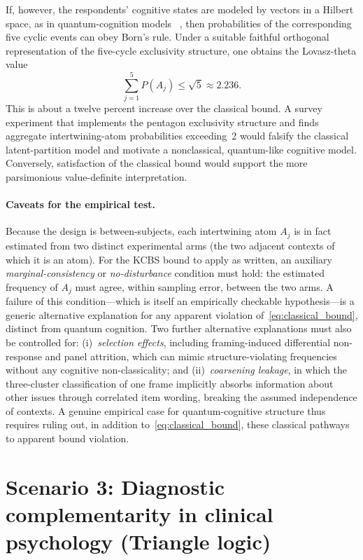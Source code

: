 \documentclass{article}
\begin{document}
If, however, the respondents' cognitive states are modeled by
vectors in a Hilbert space, as in quantum-cognition models
~\cite{Busemeyer2012}, then probabilities of the corresponding
five cyclic events can obey Born's rule. Under a suitable faithful
orthogonal representation of the five-cycle exclusivity structure,
one obtains the Lovasz-theta value
\begin{equation}
\sum_{j=1}^{5} P(A_j) \leq \sqrt{5}
\approx 2.236.
\label{eq:quantum_bound}
\end{equation}
This is about a twelve percent increase over the classical bound. A
survey experiment that implements the pentagon exclusivity structure
and finds aggregate intertwining-atom probabilities exceeding~2
would falsify the classical latent-partition model and motivate a
nonclassical, quantum-like cognitive model. Conversely, satisfaction
of the classical bound would support the more parsimonious
value-definite interpretation.

\paragraph{Caveats for the empirical test.}
Because the design is between-subjects, each intertwining atom
$A_j$ is in fact estimated from two distinct experimental arms (the
two adjacent contexts of which it is an atom). For the KCBS bound
to apply as written, an auxiliary \emph{marginal-consistency} or
\emph{no-disturbance} condition must hold: the estimated frequency
of $A_j$ must agree, within sampling error, between the two arms.
A failure of this condition---which is itself an empirically
checkable hypothesis---is a generic alternative explanation for any
apparent violation of~\eqref{eq:classical_bound}, distinct from
quantum cognition. Two further alternative explanations must also
be controlled for: (i)~\emph{selection effects}, including
framing-induced differential non-response and panel attrition, which
can mimic structure-violating frequencies without any cognitive
non-classicality; and (ii)~\emph{coarsening leakage}, in which the
three-cluster classification of one frame implicitly absorbs
information about other issues through correlated item wording,
breaking the assumed independence of contexts. A genuine empirical
case for quantum-cognitive structure thus requires ruling out, in
addition to~\eqref{eq:classical_bound}, these classical pathways to
apparent bound violation.

\section{Scenario 3: Diagnostic complementarity in clinical psychology
(Triangle logic)}
\label{sec:clinical}
\end{document}
